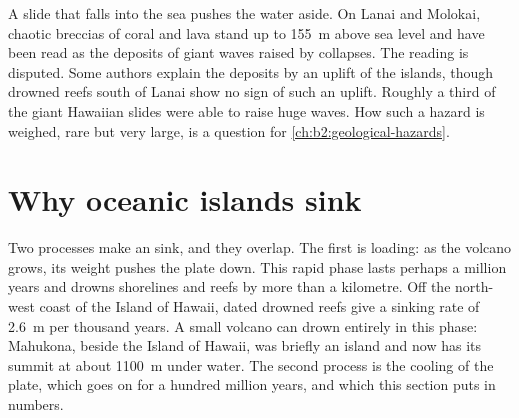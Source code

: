 \begin{omfigure}
\par{}
\end{omfigure}

A slide that falls into the sea pushes the water aside. On Lanai and Molokai, chaotic breccias
of coral and lava stand up to \qty{155}{m} above sea level and have been read as the deposits of
giant waves raised by collapses. The reading is disputed. Some authors explain the deposits by an
uplift of the islands, though drowned reefs south of Lanai show no sign of such an uplift.
Roughly a third of the giant Hawaiian slides were  able to raise huge waves. How
such a hazard is weighed, rare but very large, is a question for \cref{ch:b2:geological-hazards}.

\section{Why oceanic islands sink}\label{sec:b2:oceanic-islands:subsidence}

Two processes make an  sink, and they overlap. The first is loading: as the volcano
grows, its weight pushes the plate down. This rapid phase lasts perhaps a million years and
drowns shorelines and reefs by more than a kilometre. Off the north-west coast of the Island of
Hawaii, dated drowned reefs give a sinking rate of \qty{2.6}{m} per thousand years. A small
volcano can drown entirely in this phase: Mahukona, beside the Island of Hawaii, was briefly an
island and now has its summit at about \qty{1100}{m} under water. The second process is the
cooling of the plate, which goes on for a hundred million years, and which this section puts in
numbers.

